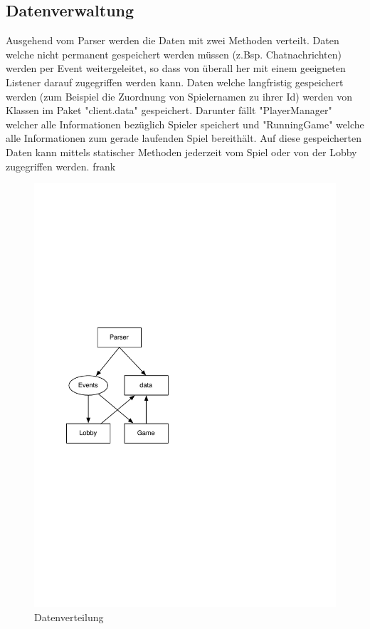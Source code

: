 \documentclass[ngerman, 12pt, pdftex]{scrartcl}[2006/07/30]
\begin{document}
\subsection{Datenverwaltung}
Ausgehend vom Parser werden die Daten mit zwei Methoden verteilt.
Daten welche nicht permanent gespeichert werden müssen (z.Bsp. Chatnachrichten) werden per Event 
weitergeleitet, so dass von überall her mit einem geeigneten Listener darauf zugegriffen werden kann.
Daten welche langfristig gespeichert werden (zum Beispiel die Zuordnung von Spielernamen zu ihrer Id) werden
von Klassen im Paket "client.data" gespeichert. Darunter fällt  "PlayerManager" welcher alle Informationen bezüglich Spieler speichert und "RunningGame" welche alle Informationen zum gerade laufenden Spiel bereithält.
Auf diese gespeicherten Daten kann mittels statischer Methoden jederzeit vom Spiel oder von der Lobby zugegriffen werden.
frank
\begin{figure}[h!]
\centering
\includegraphics[scale=0.6]{client/datenhaltung.pdf}
\caption{Datenverteilung}
\end{figure}
\end{document}
